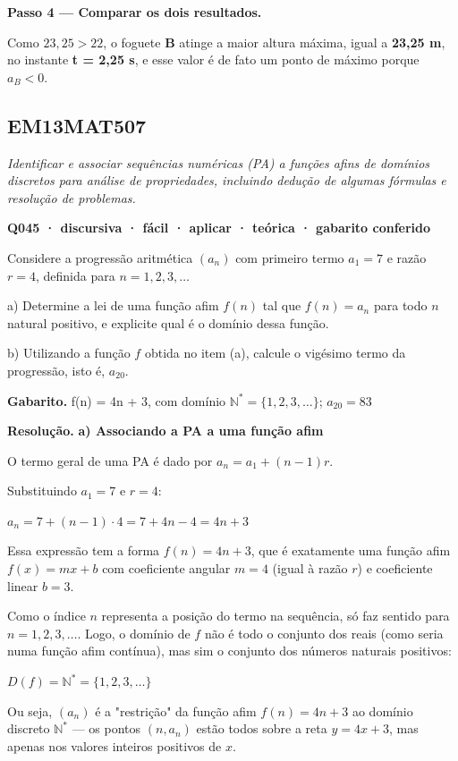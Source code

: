 \documentclass[11pt,a4paper]{article}
\begin{document}
\textbf{Passo 4 — Comparar os dois resultados.}

Como $23{,}25 > 22$, o foguete \textbf{B} atinge a maior altura máxima, igual a \textbf{23,25 m}, no instante \textbf{t = 2,25 s}, e esse valor é de fato um ponto de máximo porque $a_B<0$.
\subsection*{EM13MAT507}
{\small\itshape Identificar e associar sequências numéricas (PA) a funções afins de domínios discretos para análise de propriedades, incluindo dedução de algumas fórmulas e resolução de problemas.}

\bigskip\noindent\textbf{Q045 · discursiva · fácil · aplicar · teórica · gabarito conferido}\par\nopagebreak
Considere a progressão aritmética $(a_n)$ com primeiro termo $a_1 = 7$ e razão $r = 4$, definida para $n = 1, 2, 3, \dots$

a) Determine a lei de uma função afim $f(n)$ tal que $f(n) = a_n$ para todo $n$ natural positivo, e explicite qual é o domínio dessa função.

b) Utilizando a função $f$ obtida no item (a), calcule o vigésimo termo da progressão, isto é, $a_{20}$.

\textbf{Gabarito.} f(n) = 4n + 3, com domínio $\mathbb{N}^* = \{1,2,3,\dots\}$; $a_{20} = 83$

\textbf{Resolução.} \textbf{a) Associando a PA a uma função afim}

O termo geral de uma PA é dado por $a_n = a_1 + (n-1)r$.

Substituindo $a_1 = 7$ e $r = 4$:

$a_n = 7 + (n-1)\cdot 4 = 7 + 4n - 4 = 4n + 3$

Essa expressão tem a forma $f(n) = 4n + 3$, que é exatamente uma função afim $f(x) = mx + b$ com coeficiente angular $m = 4$ (igual à razão $r$) e coeficiente linear $b = 3$.

Como o índice $n$ representa a posição do termo na sequência, só faz sentido para $n = 1, 2, 3, \dots$. Logo, o domínio de $f$ não é todo o conjunto dos reais (como seria numa função afim contínua), mas sim o conjunto dos números naturais positivos:

$D(f) = \mathbb{N}^* = \{1, 2, 3, \dots\}$

Ou seja, $(a_n)$ é a "restrição" da função afim $f(n) = 4n+3$ ao domínio discreto $\mathbb{N}^*$ — os pontos $(n, a_n)$ estão todos sobre a reta $y = 4x + 3$, mas apenas nos valores inteiros positivos de $x$.
\end{document}
